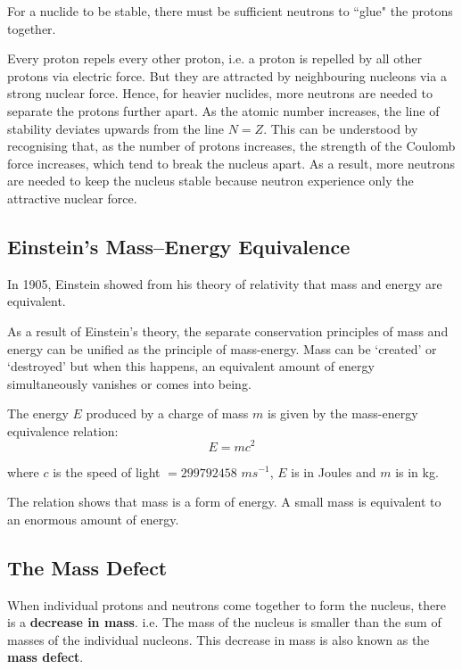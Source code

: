 For a nuclide to be stable, there must be sufficient neutrons to ``glue" the protons together.

Every proton repels every other proton, i.e. a proton is repelled by all other protons via electric force. But they are attracted by neighbouring nucleons via a strong nuclear force. Hence, for heavier nuclides, more neutrons are needed to separate the protons further apart.
As the atomic number increases, the line of stability deviates upwards from the line $N=Z$. This can be understood by recognising that, as the number of protons increases, the strength of the Coulomb force increases, which tend to break the nucleus apart. As a result, more neutrons are needed to keep the nucleus stable because neutron experience only the attractive nuclear force.

\subsection{Einstein's Mass--Energy Equivalence}

In 1905, Einstein showed from his theory of relativity that mass and energy are equivalent.

As a result of Einstein's theory, the separate conservation principles of mass and energy can be unified as the principle of mass-energy. Mass can be 	`created' or `destroyed' but when this happens, an equivalent amount of energy simultaneously vanishes or comes into being.
\begin{form}
\label{e=mc2}
The energy $E$ produced by a charge of mass $m$ is given by the mass-energy equivalence relation:
$$E=mc^2$$

where $c$ is the speed of light $= 299792458$ $ m s^{-1}$, $E$ is in Joules and $m$ is in kg.
\end{form}

The relation shows that mass is a form of energy. A small mass is equivalent to an enormous amount of energy.

\subsection{The Mass Defect}

When individual protons and neutrons come together to form the nucleus, there is a \textbf{decrease in mass}. i.e. The mass of the nucleus is smaller than the sum of masses of the individual nucleons. This decrease in mass is also known as the \textbf{mass defect}.

